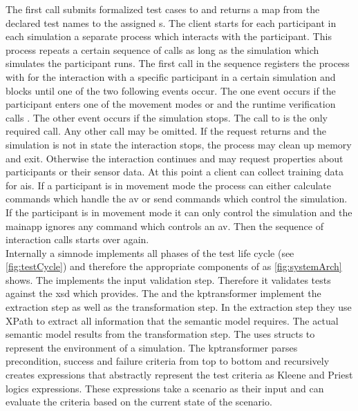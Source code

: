 The first call submits formalized test cases to \drivebuild{} and returns a map from the declared test names to the assigned \unskip{}s.
The client starts for each participant in each simulation a separate process which interacts with the participant.
This process repeats a certain sequence of calls as long as the simulation which simulates the participant runs.
The first call in the sequence registers the process with  for the interaction with a specific participant in a certain simulation and blocks until one of the two following events occur.
The one event occurs if the participant enters one of the movement modes \mmautonomous{} or \mmtraining{} and the runtime verification calls .
The other event occurs if the simulation stops.
The call to  is the only required call.
Any other call may be omitted.
If the request returns and the simulation is not in state \ssrunning{} the interaction stops, the process may clean up memory and exit.
Otherwise the interaction continues and may request properties about participants or their sensor data.
At this point a client can collect training data for \glspl{ai}.
If a participant is in movement mode \mmautonomous{} the process can either calculate commands which handle the \gls{av} or send commands which control the simulation.
If the participant is in movement mode \mmtraining{} it can only control the simulation and the \gls{mainapp} ignores any command which controls an \gls{av}.
Then the sequence of interaction calls starts over again.\\
Internally a \gls{simnode} implements all phases of the test life cycle (see \cref{fig:testCycle}) and therefore the appropriate components of \drivebuild{} as \cref{fig:systemArch} shows.
The \transformer{} implements the input validation step.
Therefore it validates tests against the \gls{xsd} which \drivebuild{} provides.
The \generator{} and the \gls{kptransformer} implement the extraction step as well as the transformation step.
In the extraction step they use XPath to extract all information that the semantic model requires.
The actual semantic model results from the transformation step.
The \generator{} uses structs to represent the environment of a simulation.
The \gls{kptransformer} parses precondition, success and failure criteria from top to bottom and recursively creates \lambda{} expressions that abstractly represent the test criteria as Kleene and Priest logics expressions.
These \lambda{} expressions take a \beamng{} scenario as their input and can evaluate the criteria based on the current state of the scenario.
